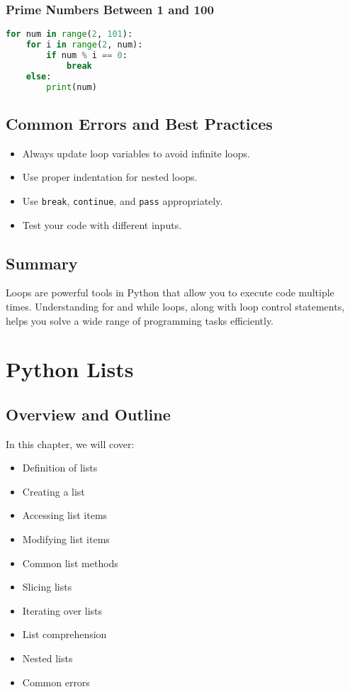 \subsection{Prime Numbers Between 1 and 100}

\begin{lstlisting}[language=Python]
for num in range(2, 101):
    for i in range(2, num):
        if num % i == 0:
            break
    else:
        print(num)
\end{lstlisting}

\section{Common Errors and Best Practices}

\begin{itemize}
    \item Always update loop variables to avoid infinite loops.
    \item Use proper indentation for nested loops.
    \item Use \texttt{break}, \texttt{continue}, and \texttt{pass} appropriately.
    \item Test your code with different inputs.
\end{itemize}

\section{Summary}

Loops are powerful tools in Python that allow you to execute code multiple times.  
Understanding for and while loops, along with loop control statements, helps you solve a wide range of programming tasks efficiently.

\chapter{Python Lists}

\section{Overview and Outline}

In this chapter, we will cover:
\begin{itemize}
    \item Definition of lists
    \item Creating a list
    \item Accessing list items
    \item Modifying list items
    \item Common list methods
    \item Slicing lists
    \item Iterating over lists
    \item List comprehension
    \item Nested lists
    \item Common errors
\end{itemize}

